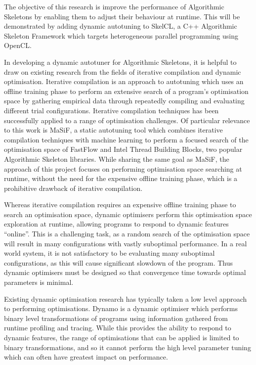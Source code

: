 The objective of this research is improve the performance of
Algorithmic Skeletons by enabling them to adjust their behaviour at
runtime. This will be demonstrated by adding dynamic autotuning to
SkelCL, a C++ Algorithmic Skeleton Framework which targets
heterogeneous parallel programming using OpenCL.

In developing a dynamic autotuner for Algorithmic Skeletons, it is
helpful to draw on existing research from the fields of iterative
compilation and dynamic optimisation. Iterative compilation is an
approach to autotuning which uses an offline training phase to perform
an extensive search of a program's optimisation space by gathering
empirical data through repeatedly compiling and evaluating different
trial configurations. Iterative compilation techniques has been
successfully applied to a range of optimisation challenges. Of
particular relevance to this work is MaSiF, a static autotuning tool
which combines iterative compilation techniques with machine learning
to perform a focused search of the optimisation space of FastFlow and
Intel Thread Building Blocks, two popular Algorithmic Skeleton
libraries. While sharing the same goal as MaSiF, the approach of this
project focuses on performing optimisation space searching at runtime,
without the need for the expensive offline training phase, which is a
prohibitive drawback of iterative compilation.

Whereas iterative compilation requires an expensive offline training
phase to search an optimisation space, dynamic optimisers perform this
optimisation space exploration at runtime, allowing programs to
respond to dynamic features ``online''. This is a challenging task, as
a random search of the optimisation space will result in many
configurations with vastly suboptimal performance. In a real world
system, it is not satisfactory to be evaluating many suboptimal
configurations, as this will cause significant slowdown of the
program. Thus dynamic optimisers must be designed so that convergence
time towards optimal parameters is minimal.

Existing dynamic optimisation research has typically taken a low level
approach to performing optimisations. Dynamo is a dynamic optimiser
which performs binary level transformations of programs using
information gathered from runtime profiling and tracing. While this
provides the ability to respond to dynamic features, the range of
optimisations that can be applied is limited to binary
transformations, and so it cannot perform the high level parameter
tuning which can often have greatest impact on performance.

